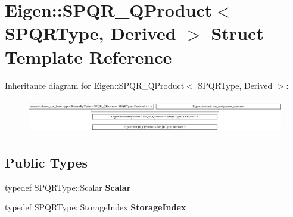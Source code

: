\hypertarget{struct_eigen_1_1_s_p_q_r___q_product}{}\section{Eigen\+::S\+P\+Q\+R\+\_\+\+Q\+Product$<$ S\+P\+Q\+R\+Type, Derived $>$ Struct Template Reference}
\label{struct_eigen_1_1_s_p_q_r___q_product}
Inheritance diagram for Eigen\+::S\+P\+Q\+R\+\_\+\+Q\+Product$<$ S\+P\+Q\+R\+Type, Derived $>$\+:\begin{figure}[H]
\begin{center}
\leavevmode
\includegraphics[height=1.502683cm]{struct_eigen_1_1_s_p_q_r___q_product}
\end{center}
\end{figure}
\subsection*{Public Types}
\begin{DoxyCompactItemize}
\item 
\mbox{\label{struct_eigen_1_1_s_p_q_r___q_product_a4856a2c3cc678f49f05d9eed34065ec6}} 
typedef S\+P\+Q\+R\+Type\+::\+Scalar {\bfseries Scalar}
\item 
\mbox{\label{struct_eigen_1_1_s_p_q_r___q_product_ab2b93e9c252b5692891b210886263d03}} 
typedef S\+P\+Q\+R\+Type\+::\+Storage\+Index {\bfseries Storage\+Index}
\end{DoxyCompactItemize}
